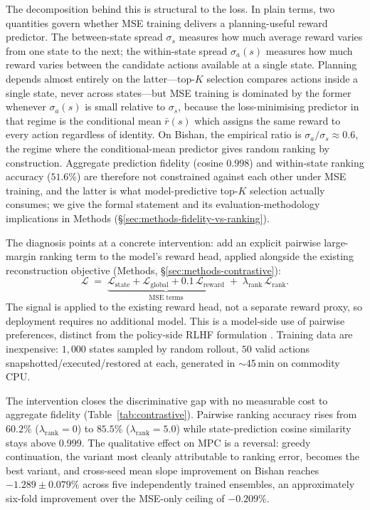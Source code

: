 \documentclass[11pt]{article}
\begin{document}
The decomposition behind this is structural to the loss. In plain terms, two quantities govern whether MSE training delivers a planning-useful reward predictor. The between-state spread $\sigma_s$ measures how much average reward varies from one state to the next; the within-state spread $\sigma_a(s)$ measures how much reward varies between the candidate actions available at a single state. Planning depends almost entirely on the latter---top-$K$ selection compares actions inside a single state, never across states---but MSE training is dominated by the former whenever $\sigma_a(s)$ is small relative to $\sigma_s$, because the loss-minimising predictor in that regime is the conditional mean $\bar{r}(s)$ which assigns the same reward to every action regardless of identity. On Bishan, the empirical ratio is $\sigma_a / \sigma_s \approx 0.6$, the regime where the conditional-mean predictor gives random ranking by construction. Aggregate prediction fidelity (cosine $0.998$) and within-state ranking accuracy ($51.6\%$) are therefore not constrained against each other under MSE training, and the latter is what model-predictive top-$K$ selection actually consumes; we give the formal statement and its evaluation-methodology implications in Methods (\S\ref{sec:methods-fidelity-vs-ranking}).

The diagnosis points at a concrete intervention: add an explicit pairwise large-margin ranking term \citep{herbrich2000large,joachims2002optimizing,burges2005learning,burges2010ranknet} to the model's reward head, applied alongside the existing reconstruction objective (Methods, \S\ref{sec:methods-contrastive}):
\begin{equation}
\mathcal{L} \;=\; \underbrace{\mathcal{L}_{\text{state}} + \mathcal{L}_{\text{global}} + 0.1\,\mathcal{L}_{\text{reward}}}_{\text{MSE terms}} \;+\; \lambda_{\text{rank}}\,\mathcal{L}_{\text{rank}}.
\end{equation}
The signal is applied to the existing reward head, not a separate reward proxy, so deployment requires no additional model. This is a model-side use of pairwise preferences, distinct from the policy-side RLHF formulation \citep{christiano2017deep,ouyang2022training}. Training data are inexpensive: $1{,}000$ states sampled by random rollout, $50$ valid actions snapshotted/executed/restored at each, generated in $\sim$45\,min on commodity CPU.

The intervention closes the discriminative gap with no measurable cost to aggregate fidelity (Table~\ref{tab:contrastive}). Pairwise ranking accuracy rises from $60.2\%$ ($\lambda_{\text{rank}}{=}0$) to $85.5\%$ ($\lambda_{\text{rank}}{=}5.0$) while state-prediction cosine similarity stays above $0.999$. The qualitative effect on MPC is a reversal: greedy continuation, the variant most cleanly attributable to ranking error, becomes the best variant, and cross-seed mean slope improvement on Bishan reaches $-1.289 \pm 0.079\%$ across five independently trained ensembles, an approximately six-fold improvement over the MSE-only ceiling of $-0.209\%$.
\end{document}
